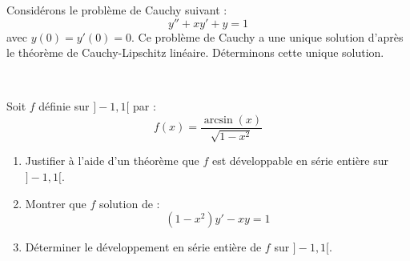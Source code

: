 \documentclass[a4paper,10pt]{report}
\begin{document}
\medskip

\begin{ex} Considérons le problème de Cauchy suivant :
$$ y''+xy'+y=1 $$
avec $y(0)=y'(0)=0$. Ce problème de Cauchy a une unique solution d'après le théorème de Cauchy-Lipschitz linéaire. Déterminons cette unique solution.

\vspace{10cm}
\end{ex}

\newpage

$\phantom{test}$

\vspace{7cm}
\begin{exa}
Soit $f$ définie sur $]-1,1[$ par :
$$ f(x) = \dfrac{\arcsin(x)}{\sqrt{1-x^2}}$$
\begin{enumerate}
\item Justifier à l'aide d'un théorème que $f$ est développable en série entière sur $]-1,1[$.
\item Montrer que $f$ solution de :
$$ (1-x^2)y'-xy=1$$
\item Déterminer le développement en série entière de $f$ sur $]-1,1[$.
\end{enumerate}
\end{exa}
\end{document}
